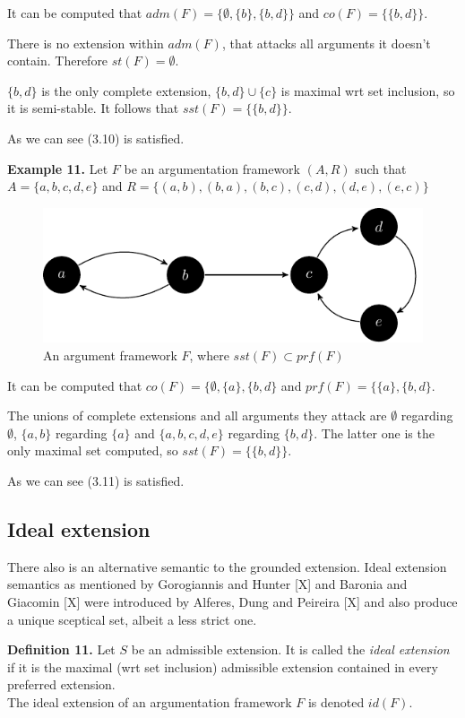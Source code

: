 \documentclass[draft,final]{vutinfth} %
\newcommand{\hl}{\par\vspace{6pt}} %
\newcommand{\cl}{\par\vspace{12pt}} %
\begin{document}
It can be computed that $adm(F)=\{\emptyset,\{b\},\{b,d\}\}$ and $co(F)=\{\{b,d\}\}$.\hl
There is no extension within $adm(F)$, that attacks all arguments it doesn't contain. Therefore $st(F)=\emptyset$.\hl
$\{b,d\}$ is the only complete extension, $\{b,d\}\cup \{c\}$ is maximal wrt set inclusion, so it is semi-stable. It follows that $sst(F)=\{\{b,d\}\}$.\hl
As we can see (3.10) is satisfied.\cl

\textbf{Example 11.} Let $F$ be an argumentation framework $(A,R)$ such that $A=\{a,b,c,d,e\}$ and $R=\{(a,b),(b,a),(b,c),(c,d),(d,e),(e,c)\}$\hl

\FloatBarrier
	\begin{figure}[!h]
		\centering
		\includegraphics[width=\linewidth]{graphs/ex5.pdf}
		\caption{An argument framework $F$, where $sst(F)\subset prf(F)$}
	\end{figure}
\FloatBarrier

It can be computed that $co(F)=\{\emptyset,\{a\},\{b,d\}$ and $prf(F)=\{\{a\},\{b,d\}$.\hl
The unions of complete extensions and all arguments they attack are $\emptyset$ regarding $\emptyset$, $\{a,b\}$ regarding $\{a\}$ and $\{a,b,c,d,e\}$ regarding $\{b,d\}$. The latter one is the only maximal set computed, so $sst(F)=\{\{b,d\}\}$.\hl
As we can see (3.11) is satisfied.\cl

\subsection{Ideal extension}
There also is an alternative semantic to the grounded extension. Ideal extension semantics as mentioned by Gorogiannis and Hunter [X] and Baronia and Giacomin [X] were introduced by Alferes, Dung and Peireira [X] and also produce a unique sceptical set, albeit a less strict one.\hl %

\textbf{Definition 11.} Let $S$ be an admissible extension. It is called the \emph{ideal extension} if it is the maximal (wrt set inclusion) admissible extension contained in every preferred extension.\\ %
 The ideal extension of an argumentation framework $F$ is denoted $id(F)$.\hl
\end{document}

